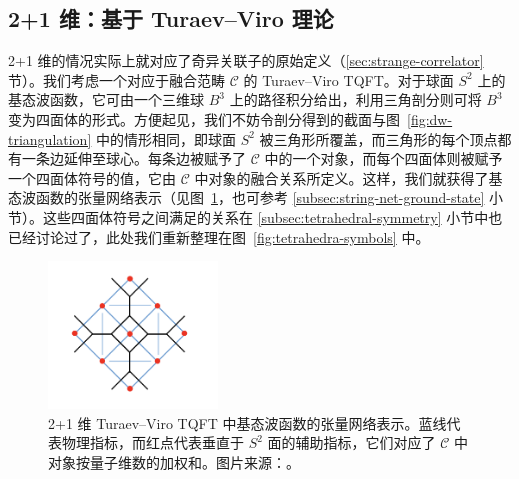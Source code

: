 \subsection{2+1 维：基于 Turaev--Viro 理论}
\label{subsec:holographic-tensor-network-2+1d}

2+1 维的情况实际上就对应了奇异关联子的原始定义（\ref{sec:strange-correlator} 节）。我们考虑一个对应于融合范畴 $\mathcal{C}$ 的 Turaev--Viro TQFT。对于球面 $S^2$ 上的基态波函数，它可由一个三维球 $B^3$ 上的路径积分给出，利用三角剖分则可将 $B^3$ 变为四面体的形式。方便起见，我们不妨令剖分得到的截面与图~\ref{fig:dw-triangulation} 中的情形相同，即球面 $S^2$ 被三角形所覆盖，而三角形的每个顶点都有一条边延伸至球心。每条边被赋予了 $\mathcal{C}$ 中的一个对象，而每个四面体则被赋予一个四面体符号的值，它由 $\mathcal{C}$ 中对象的融合关系所定义。这样，我们就获得了基态波函数的张量网络表示（见图~\ref{fig:ground-state-wave-function}，也可参考 \ref{subsec:string-net-ground-state} 小节）。这些四面体符号之间满足的关系在 \ref{subsec:tetrahedral-symmetry} 小节中也已经讨论过了，此处我们重新整理在图~\ref{fig:tetrahedra-symbols} 中。

\begin{figure}[htb]
  \centering
  \includegraphics[width=0.4\textwidth]{images/holographic/ground-state-wave-function.png}
  \caption[2+1 维 Turaev--Viro TQFT 中基态波函数的张量网络表示]{2+1 维 Turaev--Viro TQFT 中基态波函数的张量网络表示。蓝线代表物理指标，而红点代表垂直于 $S^2$ 面的辅助指标，它们对应了 $\mathcal{C}$ 中对象按量子维数的加权和。图片来源：\parencite{chen2022exact}。}
  \label{fig:ground-state-wave-function}
\end{figure}

